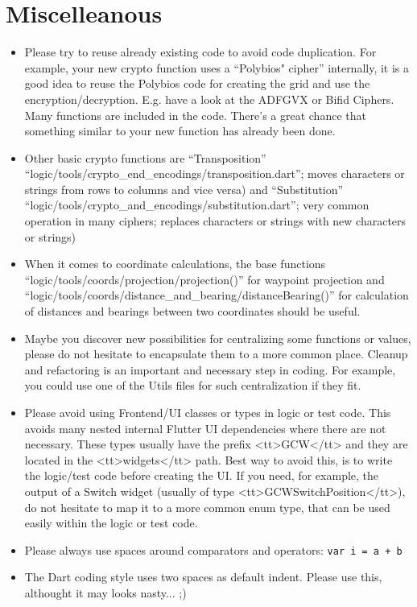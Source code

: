 \chapter{Miscelleanous}
\begin{itemize}
\item Please try to reuse already existing code to avoid code duplication. For example, your new crypto function uses a \enquote{Polybios" cipher} internally, it is a good idea to reuse the Polybios code for creating the grid and use the encryption/decryption. E.g. have a look at the ADFGVX or Bifid Ciphers. Many functions are included in the code. There's a great chance that something similar to your new function has already been done.
\item Other basic crypto functions are \enquote{Transposition} \enquote{logic/tools/crypto\_end\_encodings/transposition.dart}; moves characters or strings from rows to columns and vice versa) and \enquote{Substitution} \enquote{logic/tools/crypto\_and\_encodings/substitution.dart}; very common operation in many ciphers; replaces characters or strings with new characters or strings)
\item When it comes to coordinate calculations, the base functions \enquote{logic/tools/coords/projection/projection()} for waypoint projection and \enquote{logic/tools/coords/distance\_and\_bearing/distanceBearing()} for calculation of distances and bearings between two coordinates should be useful.
\item Maybe you discover new possibilities for centralizing some functions or values, please do not hesitate to encapsulate them to a more common place. Cleanup and refactoring is an important and necessary step in coding. For example, you could use one of the Utils files for such centralization if they fit.
\item Please avoid using Frontend/UI classes or types in logic or test code. This avoids many nested internal Flutter UI dependencies where there are not necessary. These types usually have the prefix <tt>GCW</tt> and they are located in the <tt>widgets</tt> path. Best way to avoid this, is to write the logic/test code before creating the UI. If you need, for example, the output of a Switch widget (usually of type <tt>GCWSwitchPosition</tt>), do not hesitate to map it to a more common enum type, that can be used easily within the logic or test code.
\item Please always use spaces around comparators and operators: \lstinline|var i = a + b|
\item The Dart coding style uses two spaces as default indent. Please use this, althought it may looks nasty... ;)

\end{itemize}
